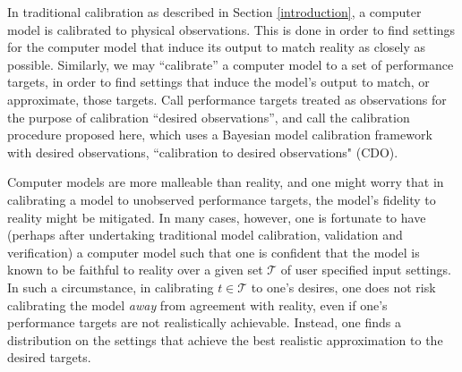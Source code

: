 \documentclass{article}
\begin{document}
%
In traditional calibration as described in Section \ref{introduction}, a computer model is calibrated to physical observations. 
%
This is done in order to find settings for the computer model that induce its output to match reality as closely as possible. 
%
Similarly, we may ``calibrate'' a computer model to a set of performance targets, in order to find settings that induce the model's output to match, or approximate, those targets. 
%
Call performance targets treated as observations for the purpose of calibration ``desired observations'', and call the calibration procedure proposed here, which uses a Bayesian model calibration framework with desired observations, ``calibration to desired observations" (CDO). 

Computer models are more malleable than reality, and one might worry that in calibrating a model to unobserved performance targets, the model's fidelity to reality might be mitigated.
%
%
In many cases, however, one is fortunate to have (perhaps after undertaking traditional model calibration, validation and verification) a computer model such that one is confident that the model is known to be faithful to reality over a given set $\mathcal T$ of user specified input settings.
%
In such a circumstance, in calibrating $t\in\mathcal T$ to one's desires, one does not risk calibrating the model \emph{away} from agreement with reality, even if one's performance targets are not realistically achievable. 
%
Instead, one finds a distribution on the settings that achieve the best realistic approximation to the desired targets.
\end{document}
